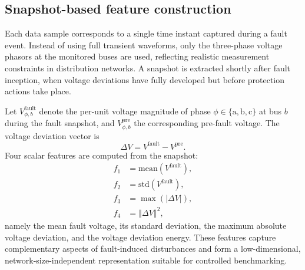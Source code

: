 \documentclass[11pt]{article}
\newcommand{\hlnew}[1]{#1}
\begin{document}
\subsection{Snapshot-based feature construction}\label{subsec3_1}

Each data sample corresponds to a single time instant captured during a fault event. \hlnew{Instead of using full transient waveforms, only the three-phase voltage phasors at the monitored buses are used,} reflecting realistic measurement constraints in distribution networks. A snapshot is extracted shortly after fault inception, when voltage deviations have fully developed but before protection actions take place.

Let $V_{\phi,b}^{\mathrm{fault}}$ denote the per-unit voltage magnitude of phase $\phi \in \{\mathrm{a},\mathrm{b},\mathrm{c}\}$ at bus $b$ during the fault snapshot, and $V_{\phi,b}^{\mathrm{pre}}$ the corresponding pre-fault voltage. The voltage deviation vector is
\begin{equation}\label{eq2}
\Delta V = V^{\mathrm{fault}} - V^{\mathrm{pre}}.
\end{equation}
Four scalar features are computed from the snapshot:
\begin{align}
f_{1} &= \mathrm{mean}\left(V^{\mathrm{fault}}\right), \label{eq3}\\
f_{2} &= \mathrm{std}\left(V^{\mathrm{fault}}\right), \label{eq4}\\
f_{3} &= \max\left(\left|\Delta V\right|\right), \label{eq5}\\
f_{4} &= \left\Vert \Delta V \right\Vert^{2}, \label{eq6}
\end{align}
namely the mean fault voltage, its standard deviation, the maximum absolute voltage deviation, and the voltage deviation energy. These features capture complementary aspects of fault-induced disturbances and form a low-dimensional, network-size-independent representation suitable for controlled benchmarking.
\end{document}
